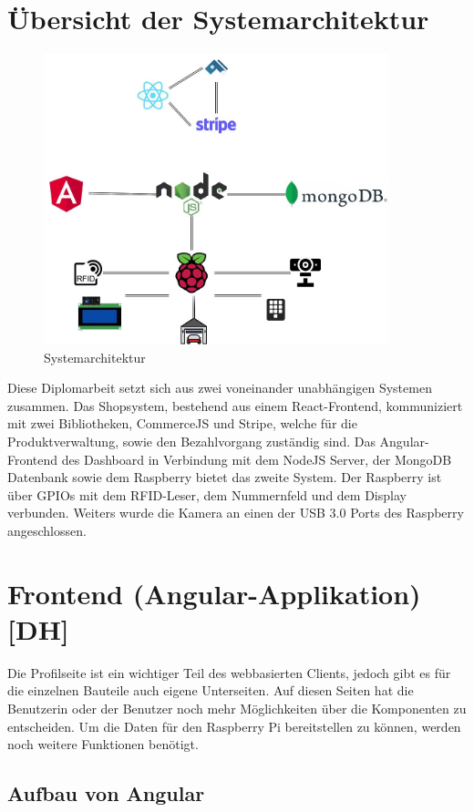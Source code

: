 \section{Übersicht der Systemarchitektur}
\begin{figure}[h]
    \centering
    \includegraphics[width=10cm]{pics/APERTASystemarchitektur.jpg}
    \caption{Systemarchitektur}
    \end{figure}
Diese Diplomarbeit setzt sich aus zwei voneinander unabhängigen Systemen zusammen. Das Shopsystem, bestehend aus einem React-Frontend, kommuniziert mit zwei Bibliotheken, CommerceJS und Stripe, welche für die Produktverwaltung, sowie den Bezahlvorgang zuständig sind. Das Angular-Frontend des Dashboard in Verbindung mit dem NodeJS Server, der MongoDB Datenbank sowie dem Raspberry bietet das zweite System.
Der Raspberry ist über GPIOs mit dem RFID-Leser, dem Nummernfeld und dem Display verbunden. Weiters wurde die Kamera an einen der USB 3.0 Ports des Raspberry angeschlossen.
\section{Frontend (Angular-Applikation) [DH]}

Die Profilseite ist ein wichtiger Teil des webbasierten Clients, jedoch gibt es für die einzelnen Bauteile auch eigene Unterseiten. Auf diesen Seiten hat die Benutzerin oder der Benutzer noch mehr Möglichkeiten über die Komponenten zu entscheiden. Um die Daten für den Raspberry Pi bereitstellen zu können, werden noch weitere Funktionen benötigt.

\subsection{Aufbau von Angular}

